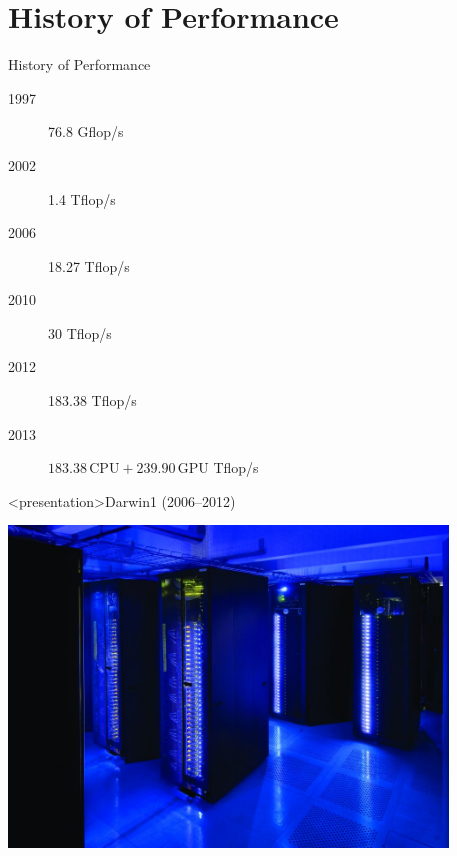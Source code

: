\section{History of Performance}
\begin{frame}{History of Performance}
\medskip
\begin{description}
\item[1997]{76.8 Gflop/s}
\item[2002]{1.4 Tflop/s}
\item[2006]{18.27 Tflop/s}
\item[2010]{30 Tflop/s}
\item[2012]{183.38 Tflop/s}
\item[2013]{$183.38\,\mbox{CPU}{}+ 239.90\,\mbox{GPU}$ Tflop/s}
\medskip
\end{description}
\end{frame}

\begin{frame}<presentation>{Darwin1 (2006--2012)}
\centerline{\includegraphics[width=0.875\textwidth]{imgs/darwin.jpg}}%
\smallskip
\end{frame}

